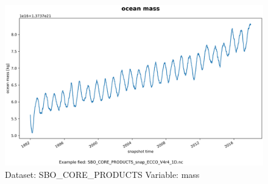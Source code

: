 \begin{figure}[H]
\centering
\includegraphics[scale=0.55]{../images/plots/oneD_plots/SBO_Core_Products/mass.png}
\caption{Dataset: SBO\_CORE\_PRODUCTS Variable: mass}
\label{tab:table-SBO_CORE_PRODUCTS_mass-Plot}
\end{figure}
\pagebreak
